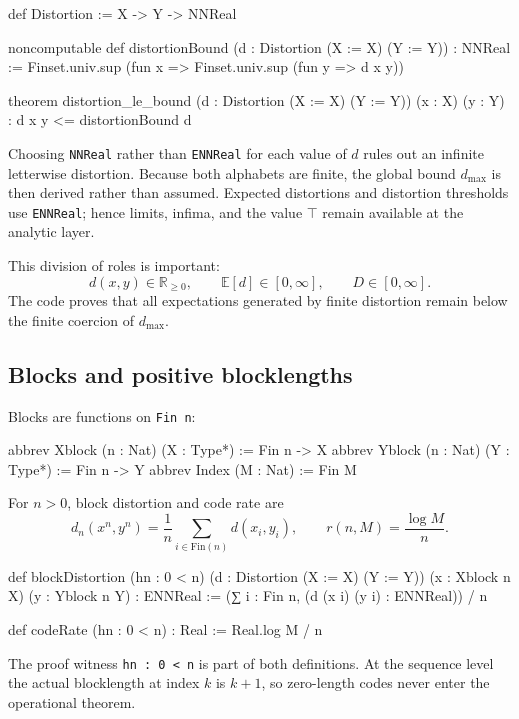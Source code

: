 \documentclass[11pt]{article}
\newcommand{\E}{\mathbb{E}}
\newcommand{\dmax}{d_{\max}}
\begin{document}
\begin{LeanCode}
def Distortion := X -> Y -> NNReal

noncomputable def distortionBound
    (d : Distortion (X := X) (Y := Y)) : NNReal :=
  Finset.univ.sup (fun x => Finset.univ.sup (fun y => d x y))

theorem distortion_le_bound
    (d : Distortion (X := X) (Y := Y)) (x : X) (y : Y) :
    d x y <= distortionBound d
\end{LeanCode}

Choosing \texttt{NNReal} rather than \texttt{ENNReal} for each value of $d$
rules out an infinite letterwise distortion.  Because both alphabets are finite,
the global bound $\dmax$ is then derived rather than assumed.  Expected
distortions and distortion thresholds use \texttt{ENNReal}; hence limits,
infima, and the value $\top$ remain available at the analytic layer.

This division of roles is important:
\[
  d(x,y)\in\mathbb{R}_{\ge0},\qquad
  \E[d]\in[0,\infty],\qquad D\in[0,\infty].
\]
The code proves that all expectations generated by finite distortion remain
below the finite coercion of $\dmax$.

\subsection{Blocks and positive blocklengths}

Blocks are functions on \texttt{Fin n}:

\begin{LeanCode}
abbrev Xblock (n : Nat) (X : Type*) := Fin n -> X
abbrev Yblock (n : Nat) (Y : Type*) := Fin n -> Y
abbrev Index (M : Nat) := Fin M
\end{LeanCode}

For $n>0$, block distortion and code rate are
\[
  d_n(x^n,y^n)=\frac1n\sum_{i\in\mathrm{Fin}(n)}d(x_i,y_i),
  \qquad r(n,M)=\frac{\log M}{n}.
\]

\begin{LeanCode}
def blockDistortion (hn : 0 < n)
    (d : Distortion (X := X) (Y := Y))
    (x : Xblock n X) (y : Yblock n Y) : ENNReal :=
  (∑ i : Fin n, (d (x i) (y i) : ENNReal)) / n

def codeRate (hn : 0 < n) : Real := Real.log M / n
\end{LeanCode}

The proof witness \texttt{hn : 0 < n} is part of both definitions.  At the
sequence level the actual blocklength at index $k$ is $k+1$, so zero-length
codes never enter the operational theorem.
\end{document}
